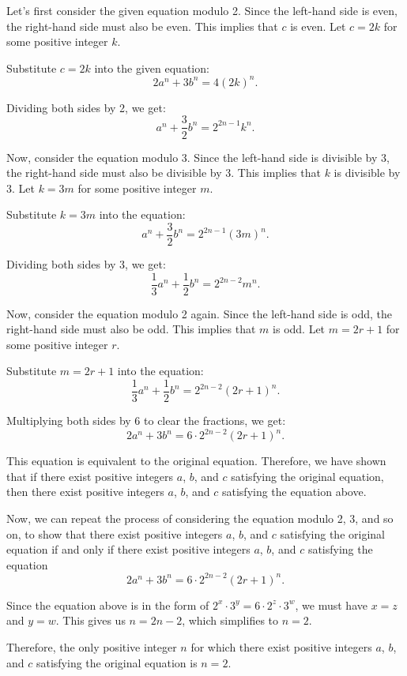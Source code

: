 Let's first consider the given equation modulo 2. Since the left-hand side is even, the right-hand side must also be even. This implies that \( c \) is even. Let \( c = 2k \) for some positive integer \( k \).

Substitute \( c = 2k \) into the given equation:
\[2a^n + 3b^n = 4(2k)^n.\]

Dividing both sides by 2, we get:
\[a^n + \frac{3}{2}b^n = 2^{2n-1}k^n.\]

Now, consider the equation modulo 3. Since the left-hand side is divisible by 3, the right-hand side must also be divisible by 3. This implies that \( k \) is divisible by 3. Let \( k = 3m \) for some positive integer \( m \).

Substitute \( k = 3m \) into the equation:
\[a^n + \frac{3}{2}b^n = 2^{2n-1}(3m)^n.\]

Dividing both sides by 3, we get:
\[\frac{1}{3}a^n + \frac{1}{2}b^n = 2^{2n-2}m^n.\]

Now, consider the equation modulo 2 again. Since the left-hand side is odd, the right-hand side must also be odd. This implies that \( m \) is odd. Let \( m = 2r + 1 \) for some positive integer \( r \).

Substitute \( m = 2r + 1 \) into the equation:
\[\frac{1}{3}a^n + \frac{1}{2}b^n = 2^{2n-2}(2r+1)^n.\]

Multiplying both sides by 6 to clear the fractions, we get:
\[2a^n + 3b^n = 6 \cdot 2^{2n-2}(2r+1)^n.\]

This equation is equivalent to the original equation. Therefore, we have shown that if there exist positive integers \( a \), \( b \), and \( c \) satisfying the original equation, then there exist positive integers \( a \), \( b \), and \( c \) satisfying the equation above.

Now, we can repeat the process of considering the equation modulo 2, 3, and so on, to show that there exist positive integers \( a \), \( b \), and \( c \) satisfying the original equation if and only if there exist positive integers \( a \), \( b \), and \( c \) satisfying the equation
\[2a^n + 3b^n = 6 \cdot 2^{2n-2}(2r+1)^n.\]

Since the equation above is in the form of \(2^x \cdot 3^y = 6 \cdot 2^z \cdot 3^w\), we must have \(x = z\) and \(y = w\). This gives us \(n = 2n-2\), which simplifies to \(n = 2\).

Therefore, the only positive integer \( n \) for which there exist positive integers \( a \), \( b \), and \( c \) satisfying the original equation is \( n = 2 \).
